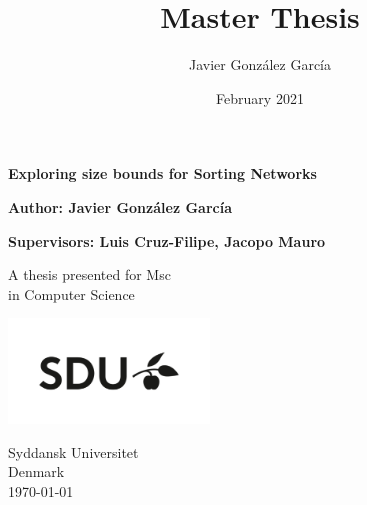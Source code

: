 \documentclass{article}
\title{Master Thesis}
\author{ Javier González García }
\date{February 2021}
\begin{document}
\begin{titlepage}
	\begin{center}
		\vspace*{1cm}
		
		\Large
		\textbf{Exploring size bounds for Sorting Networks}
		
		\vspace{1.5cm}
		
		\textbf{Author: Javier González García}
		\vfill
		
		\textbf{Supervisors: Luis Cruz-Filipe, Jacopo Mauro}
		
		A thesis presented for Msc\\
		in Computer Science
		
		\vspace{0.8cm}
		
		\includegraphics[width=0.4\textwidth]{images/sdu_logo}
		
		Syddansk Universitet\\
		Denmark\\
		\today
		
	\end{center}
\end{titlepage}
















\end{document}
